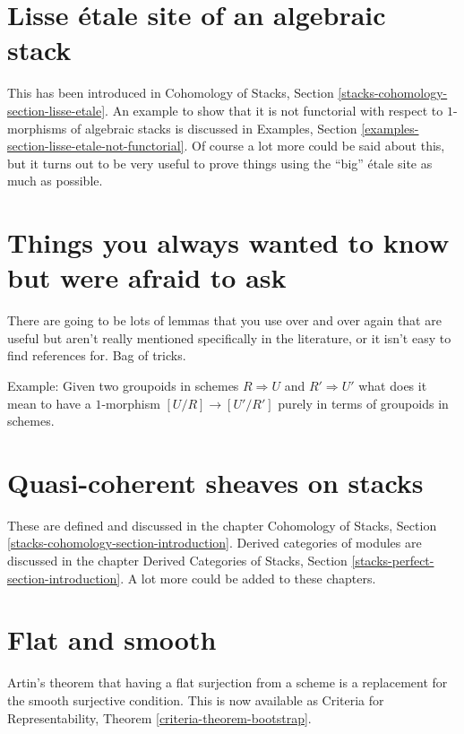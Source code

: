 \section{Lisse \'etale site of an algebraic stack}
\label{section-lisse-etale}

\noindent
This has been introduced in
Cohomology of Stacks, Section \ref{stacks-cohomology-section-lisse-etale}.
An example to show that it is not functorial with respect to $1$-morphisms
of algebraic stacks is discussed in
Examples, Section \ref{examples-section-lisse-etale-not-functorial}.
Of course a lot more could be said about this, but it turns out
to be very useful to prove things using the ``big'' \'etale site
as much as possible.



\section{Things you always wanted to know but were afraid to ask}
\label{section-stacks-fun-lemmas}

\noindent
There are going to be lots of lemmas that you use over and over again
that are useful but aren't really mentioned specifically in the literature,
or it isn't easy to find references for. Bag of tricks.

\medskip\noindent
Example: Given two groupoids in schemes $R\Rightarrow U$ and
$R' \Rightarrow U'$ what does it mean to have a $1$-morphism
$[U/R] \to [U'/R']$ purely in terms of groupoids in schemes.



\section{Quasi-coherent sheaves on stacks}
\label{section-quasi-coherent}

\noindent
These are defined and discussed in the chapter
Cohomology of Stacks, Section \ref{stacks-cohomology-section-introduction}.
Derived categories of modules are discussed in the chapter
Derived Categories of Stacks, Section \ref{stacks-perfect-section-introduction}.
A lot more could be added to these chapters.



\section{Flat and smooth}
\label{section-flat-smooth}

\noindent
Artin's theorem that having a flat surjection from a scheme is a replacement
for the smooth surjective condition. This is now available as
Criteria for Representability, Theorem \ref{criteria-theorem-bootstrap}.


